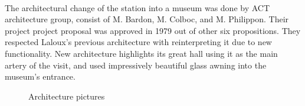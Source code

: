 \documentclass[
10pt, %
a4paper, %
oneside, %
headinclude,footinclude, %
BCOR5mm, %
]{scrartcl}
\theoremstyle{definition} %
\theoremstyle{plain} %
\theoremstyle{remark} %
\begin{document}
\paragraph{} The architectural change of the station into a museum was done by ACT architecture group, consist of M. Bardon, M. Colboc, and M. Philippon. Their project project proposal was approved in 1979 out of other six propositions. They respected Laloux's previous architecture with reinterpreting it due to new functionality. New architecture highlights its great hall using it as the main artery of the visit, and used impressively beautiful glass awning into the museum's entrance.

\begin{figure}[tbh]
\centering

\label{fig:Palais}
 \quad
{}

\caption[Architecture pictures]{Architecture pictures} %
\label{fig:Architecture}
\end{figure}
\end{document}
